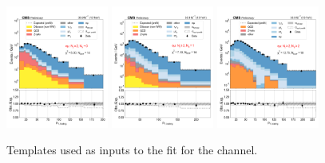 \begin{figure}[htb!]
    \includegraphics[width=0.3\textwidth]{chapters/Analysis/sectionStatisticalAnalysis/figures/fit/emu_cat_gt2_eq0}
    \includegraphics[width=0.3\textwidth]{chapters/Analysis/sectionStatisticalAnalysis/figures/fit/emu_cat_gt2_eq1_a}
    \includegraphics[width=0.3\textwidth]{chapters/Analysis/sectionStatisticalAnalysis/figures/fit/emu_cat_gt2_gt2_a}
    \caption{Templates used as inputs to the fit for the \cem channel.}
    \label{fig:analysis:method:mle:fits_templates_emu}
\end{figure}
